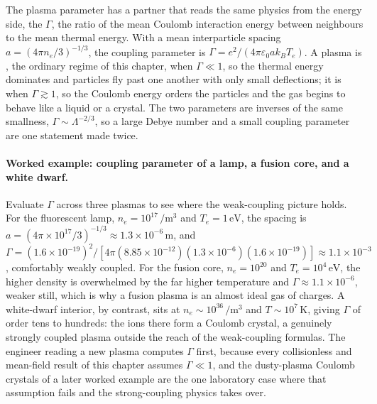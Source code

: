 The plasma parameter has a partner that reads the same physics from the energy
side, the  $\Gamma$, the ratio of the mean Coulomb
interaction energy between neighbours to the mean thermal energy. With a mean
interparticle spacing $a = (4\pi n_e/3)^{-1/3}$, the coupling parameter is
$\Gamma = e^{2}/(4\pi\varepsilon_0 a k_B T_e)$. A plasma is , the ordinary regime of this chapter, when $\Gamma \ll 1$, so the
thermal energy dominates and particles fly past one another with only small
deflections; it is  when $\Gamma \gtrsim 1$, so the
Coulomb energy orders the particles and the gas begins to behave like a liquid
or a crystal. The two parameters are inverses of the same smallness, $\Gamma
\sim \Lambda^{-2/3}$, so a large Debye number and a small coupling parameter are
one statement made twice.

\paragraph{Worked example: coupling parameter of a lamp, a fusion core, and a white dwarf.}
Evaluate $\Gamma$ across three plasmas to see where the weak-coupling picture
holds. For the fluorescent lamp, $n_e = 10^{17}\,\si{\per\meter\cubed}$ and
$T_e = 1\,\si{\electronvolt}$, the spacing is $a = (4\pi\times 10^{17}/3)^{-1/3}
\approx 1.3\times 10^{-6}\,\si{\meter}$, and $\Gamma = (1.6\times 10^{-19})^{2}/
[4\pi(8.85\times 10^{-12})(1.3\times 10^{-6})(1.6\times 10^{-19})] \approx
1.1\times 10^{-3}$, comfortably weakly coupled. For the fusion core, $n_e =
10^{20}$ and $T_e = 10^{4}\,\text{eV}$, the higher density is overwhelmed by the
far higher temperature and $\Gamma \approx 1.1\times 10^{-6}$, weaker still, which
is why a fusion plasma is an almost ideal gas of charges. A white-dwarf interior,
by contrast, sits at $n_e \sim 10^{36}\,\si{\per\meter\cubed}$ and $T \sim
10^{7}\,\si{\kelvin}$, giving $\Gamma$ of order tens to hundreds: the ions there
form a Coulomb crystal, a genuinely strongly coupled plasma outside the reach of
the weak-coupling formulas. The engineer reading a new plasma computes $\Gamma$
first, because every collisionless and mean-field result of this chapter assumes
$\Gamma \ll 1$, and the dusty-plasma Coulomb crystals of a later worked example
are the one laboratory case where that assumption fails and the strong-coupling
physics takes over.



